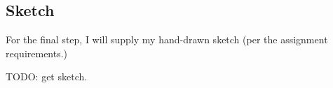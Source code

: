 \subsection{Sketch}

For the final step, I will supply my hand-drawn sketch (per the assignment
requirements.)

TODO: get sketch.